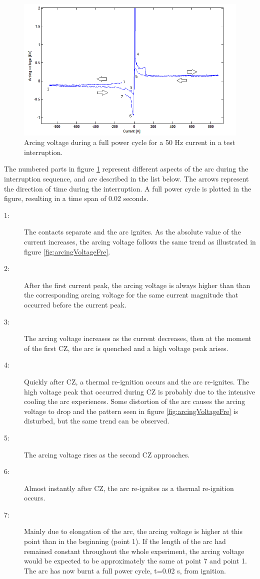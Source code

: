 \documentclass[10pt,b5paper,twoside]{article}
\begin{document}
\begin{figure}[H]
\centering
\includegraphics[scale=0.7]{Bilder/Theory/arcingVoltagevzCurrent3.png}
\caption{Arcing voltage during a full power cycle for a 50 Hz current in a test interruption.} \label{fig:arcingVoltageVSCurrent}
\end{figure}

The numbered parts in figure \ref{fig:arcingVoltageVSCurrent} represent different aspects of the arc during the interruption sequence, and are described in the list below. The arrows represent the direction of time during the interruption. A full power cycle is plotted in the figure, resulting in a time span of 0.02 seconds.
\begin{description}
\item[1:] The contacts separate and the arc ignites. As the absolute value of the current increases, the arcing voltage follows the same trend as illustrated in figure \ref{fig:arcingVoltageFre}.  
\item[2:] After the first current peak, the arcing voltage is always higher than than the corresponding arcing voltage for the same current magnitude that occurred before the current peak.
\item[3:] The arcing voltage increases as the current decreases, then at the moment of the first CZ, the arc is quenched and a high voltage peak arises.
\item[4:] Quickly after CZ, a thermal re-ignition occurs and the arc re-ignites. The high voltage peak that occurred during CZ is probably due to the intensive cooling the arc experiences. Some distortion of the arc causes the arcing voltage to drop and the pattern seen in figure \ref{fig:arcingVoltageFre} is disturbed, but the same trend can be observed.
\item[5:] The arcing voltage rises as the second CZ approaches.
\item[6:] Almost instantly after CZ, the arc re-ignites as a thermal re-ignition occurs.
\item[7:] Mainly due to elongation of the arc, the arcing voltage is higher at this point than in the beginning (point 1). If the length of the arc had remained constant throughout the whole experiment, the arcing voltage would be expected to be approximately the same at point 7 and point 1. The arc has now burnt a full power cycle, t=0.02 s, from ignition.
\end{description}
\end{document}
